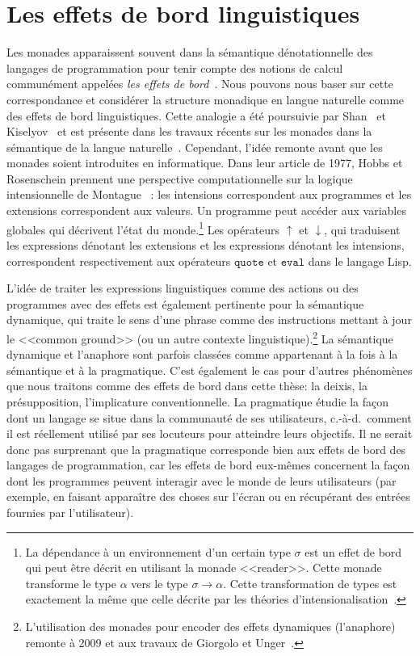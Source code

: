 \section*{Les effets de bord linguistiques}

Les monades apparaissent souvent dans la sémantique dénotationnelle des langages
de programmation pour tenir compte des notions de calcul communément appelées
\emph {les effets de bord}~\cite{moggi1991notions}. Nous pouvons nous baser sur
cette correspondance et considérer la structure monadique en langue naturelle
comme des effets de bord linguistiques. Cette analogie a été poursuivie par
Shan~\cite{shan2005linguistic,shan2005thesis} et
Kiselyov~\cite{kiselyov2008call} et est présente dans les travaux récents sur
les monades dans la sémantique de la langue
naturelle~\cite{giorgolo2012monads,charlow2014semantics}. Cependant, l'idée
remonte avant que les monades soient introduites en informatique. Dans leur
article de 1977, Hobbs et Rosenschein prennent une perspective computationnelle
sur la logique intensionnelle de Montague~\cite{montague1973proper} : les
intensions correspondent aux programmes et les extensions correspondent aux
valeurs. Un programme peut accéder aux variables globales qui décrivent l'état
du monde.\footnote{La dépendance à un environnement d'un certain type $\sigma$
  est un effet de bord qui peut être décrit en utilisant la monade <<reader>>.
  Cette monade transforme le type $\alpha$ vers le type $\sigma \to \alpha$.
  Cette transformation de types est exactement la même que celle décrite par les
  théories d'intensionalisation~\cite{ben2007semantics,de2013note}.} Les
opérateurs $\uparrow$ et $\downarrow$, qui traduisent les expressions dénotant
les extensions et les expressions dénotant les intensions, correspondent
respectivement aux opérateurs $\texttt{quote} $ et $\texttt{eval}$ dans le
langage Lisp.

L'idée de traiter les expressions linguistiques comme des actions ou des
programmes avec des effets est également pertinente pour la sémantique
dynamique, qui traite le sens d'une phrase comme des instructions mettant à
jour le <<common ground>> (ou un autre contexte
linguistique).\footnote{L'utilisation des monades pour encoder des effets
  dynamiques (l'anaphore) remonte à 2009 et aux travaux de Giorgolo et
  Unger~\cite{giorgolo2009coreference,unger2012dynamic}.} La sémantique
dynamique et l'anaphore sont parfois classées comme appartenant à la fois à la
sémantique et à la pragmatique. C'est également le cas pour d'autres phénomènes
que nous traitons comme des effets de bord dans cette thèse: la deixis, la
présupposition, l'implicature conventionnelle. La pragmatique étudie la façon
dont un langage se situe dans la communauté de ses utilisateurs, c.-à-d.\ comment
il est réellement utilisé par ses locuteurs pour atteindre leurs objectifs. Il
ne serait donc pas surprenant que la pragmatique corresponde bien aux effets de
bord des langages de programmation, car les effets de bord eux-mêmes concernent
la façon dont les programmes peuvent interagir avec le monde de leurs
utilisateurs (par exemple, en faisant apparaître des choses sur l'écran ou en
récupérant des entrées fournies par l'utilisateur).


